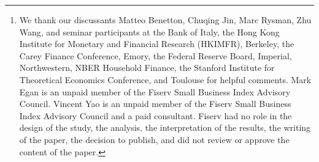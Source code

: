 \documentclass[11pt,english]{article}
\theoremstyle{remark}
\begin{document}
\date{\today\thanks{We thank our discussants Matteo Benetton, Chuqing Jin, Marc Rysman, Zhu Wang, and seminar participants at the Bank of Italy, the Hong Kong Institute for Monetary and Financial Research (HKIMFR), Berkeley, the Carey Finance Conference, Emory, the Federal Reserve Board, Imperial, Northwestern, NBER Household Finance, the Stanford Institute for Theoretical Economics Conference, and Toulouse for helpful comments. Mark Egan is an unpaid member of the Fiserv Small Business Index Advisory Council. Vincent Yao is an unpaid member of the Fiserv Small Business Index Advisory Council and a paid consultant. Fiserv had no role in the design of the study, the analysis, the interpretation of the results, the writing of the paper, the decision to publish, and did not review or approve the content of the paper.}}

\maketitle



 \thispagestyle{empty} 
\end{document}
